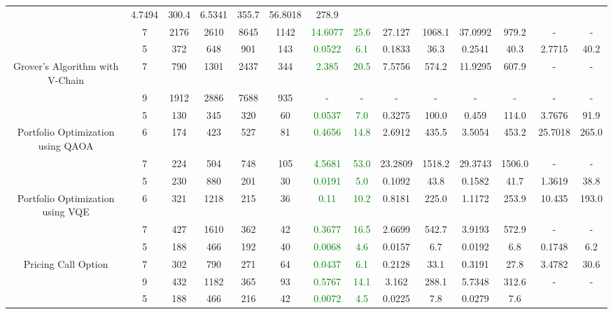 \begin{table}[htb]
{\begin{tabular}{|c|c|c|c|c|c|c|c|c|c|c|c|c|c|}
 & 4.7494 & 300.4
 & 6.5341 & 355.7
 & 56.8018 & 278.9
 \\
 & 
7 & 2176 & 2610 & 8645 & 1142
 & \textcolor{green}{14.6077} & \textcolor{green}{25.6}
 & 27.127 & 1068.1
 & 37.0992 & 979.2
 & - & -
 \\
\hline
 & 
5 & 372 & 648 & 901 & 143
 & \textcolor{green}{0.0522} & \textcolor{green}{6.1}
 & 0.1833 & 36.3
 & 0.2541 & 40.3
 & 2.7715 & 40.2
 \\
Grover's Algorithm with V-Chain & 
7 & 790 & 1301 & 2437 & 344
 & \textcolor{green}{2.385} & \textcolor{green}{20.5}
 & 7.5756 & 574.2
 & 11.9295 & 607.9
 & - & -
 \\
 & 
9 & 1912 & 2886 & 7688 & 935
 & - & -
 & - & -
 & - & -
 & - & -
 \\
\hline
 & 
5 & 130 & 345 & 320 & 60
 & \textcolor{green}{0.0537} & \textcolor{green}{7.0}
 & 0.3275 & 100.0
 & 0.459 & 114.0
 & 3.7676 & 91.9
 \\
Portfolio Optimization using QAOA & 
6 & 174 & 423 & 527 & 81
 & \textcolor{green}{0.4656} & \textcolor{green}{14.8}
 & 2.6912 & 435.5
 & 3.5054 & 453.2
 & 25.7018 & 265.0
 \\
 & 
7 & 224 & 504 & 748 & 105
 & \textcolor{green}{4.5681} & \textcolor{green}{53.0}
 & 23.2809 & 1518.2
 & 29.3743 & 1506.0
 & - & -
 \\
\hline
 & 
5 & 230 & 880 & 201 & 30
 & \textcolor{green}{0.0191} & \textcolor{green}{5.0}
 & 0.1092 & 43.8
 & 0.1582 & 41.7
 & 1.3619 & 38.8
 \\
Portfolio Optimization using VQE & 
6 & 321 & 1218 & 215 & 36
 & \textcolor{green}{0.11} & \textcolor{green}{10.2}
 & 0.8181 & 225.0
 & 1.1172 & 253.9
 & 10.435 & 193.0
 \\
 & 
7 & 427 & 1610 & 362 & 42
 & \textcolor{green}{0.3677} & \textcolor{green}{16.5}
 & 2.6699 & 542.7
 & 3.9193 & 572.9
 & - & -
 \\
\hline
 & 
5 & 188 & 466 & 192 & 40
 & \textcolor{green}{0.0068} & \textcolor{green}{4.6}
 & 0.0157 & 6.7
 & 0.0192 & 6.8
 & 0.1748 & 6.2
 \\
Pricing Call Option & 
7 & 302 & 790 & 271 & 64
 & \textcolor{green}{0.0437} & \textcolor{green}{6.1}
 & 0.2128 & 33.1
 & 0.3191 & 27.8
 & 3.4782 & 30.6
 \\
 & 
9 & 432 & 1182 & 365 & 93
 & \textcolor{green}{0.5767} & \textcolor{green}{14.1}
 & 3.162 & 288.1
 & 5.7348 & 312.6
 & - & -
 \\
\hline
 & 
5 & 188 & 466 & 216 & 42
 & \textcolor{green}{0.0072} & \textcolor{green}{4.5}
 & 0.0225 & 7.8
 & 0.0279 & 7.6

\end{tabular}}
\end{table}
